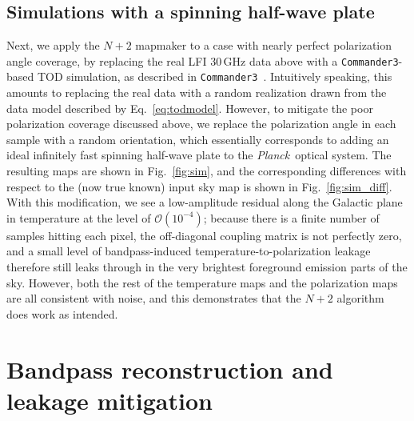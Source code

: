 \documentclass{aa}
\def\commanderthree{\texttt{Commander3}}
\def\Planck{\textit{Planck}}
\begin{document}
\subsection{Simulations with a spinning half-wave plate}
\label{sec:sim}

Next, we apply the $N+2$ mapmaker to a case with nearly perfect polarization angle coverage, by replacing the real LFI 30\,GHz data above with a \commanderthree-based TOD simulation, as described in \commanderthree\ \citep{BP04}. Intuitively speaking, this amounts to replacing the real data with a random realization drawn from the data model described by Eq.~\ref{eq:todmodel}. However, to mitigate the poor polarization coverage discussed above, we replace the polarization angle in each sample with a random orientation, which essentially corresponds to adding an ideal infinitely fast spinning half-wave plate to the \Planck\ optical system. The resulting maps are shown in Fig.~\ref{fig:sim}, and the corresponding differences with respect to the (now true known) input sky map is shown in Fig.~\ref{fig:sim_diff}. With this modification, we see a low-amplitude residual along the Galactic plane in temperature at the level of $\mathcal{O}(10^{-4})$; because there is a finite number of samples hitting each pixel, the off-diagonal coupling matrix is not perfectly zero, and a small level of bandpass-induced temperature-to-polarization leakage therefore still leaks through in the very brightest foreground emission parts of the sky. However, both the rest of the temperature maps and the polarization maps are all consistent with noise, and this demonstrates that the $N+2$ algorithm does work as intended.

\section{Bandpass reconstruction and leakage mitigation}
\end{document}
